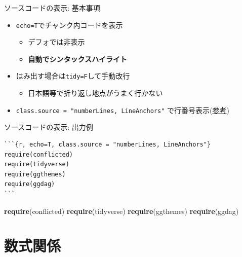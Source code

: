 \documentclass[
  12pt,
  ignorenonframetext,
]{beamer}
\newenvironment{Shaded}{\begin{snugshade}}{\end{snugshade}}
\newcommand{\KeywordTok}[1]{\textcolor[rgb]{0.13,0.29,0.53}{\textbf{#1}}}
\newcommand{\NormalTok}[1]{#1}
\providecommand{\tightlist}{%
  \setlength{\itemsep}{0pt}\setlength{\parskip}{0pt}}
\begin{document}
\begin{frame}[fragile]{ソースコードの表示: 基本事項}
\protect\hypertarget{ux30bdux30fcux30b9ux30b3ux30fcux30c9ux306eux8868ux793a-ux57faux672cux4e8bux9805}{}

\begin{itemize}
\tightlist
\item
  \texttt{echo=T}でチャンク内コードを表示

  \begin{itemize}
  \tightlist
  \item
    デフォでは非表示
  \item
    \textbf{自動でシンタックスハイライト}
  \end{itemize}
\item
  はみ出す場合は\texttt{tidy=F}して手動改行

  \begin{itemize}
  \tightlist
  \item
    日本語等で折り返し地点がうまく行かない
  \end{itemize}
\item
  \texttt{class.source\ =\ "numberLines,\ LineAnchors"}
  で行番号表示(\href{https://blog.atusy.net/2019/04/18/rmd-line-num/}{参考})
\end{itemize}

\end{frame}

\begin{frame}[fragile]{ソースコードの表示: 出力例}
\protect\hypertarget{ux30bdux30fcux30b9ux30b3ux30fcux30c9ux306eux8868ux793a-ux51faux529bux4f8b}{}

\begin{verbatim}
```{r, echo=T, class.source = "numberLines, LineAnchors"}
require(conflicted) 
require(tidyverse)
require(ggthemes)
require(ggdag)
```
\end{verbatim}

\begin{Shaded}
\begin{Highlighting}[numbers=left,,]
\KeywordTok{require}\NormalTok{(conflicted)}
\KeywordTok{require}\NormalTok{(tidyverse)}
\KeywordTok{require}\NormalTok{(ggthemes)}
\KeywordTok{require}\NormalTok{(ggdag)}
\end{Highlighting}
\end{Shaded}

\end{frame}

\hypertarget{ux6570ux5f0fux95a2ux4fc2}{%
\section{数式関係}\label{ux6570ux5f0fux95a2ux4fc2}}
\end{document}
